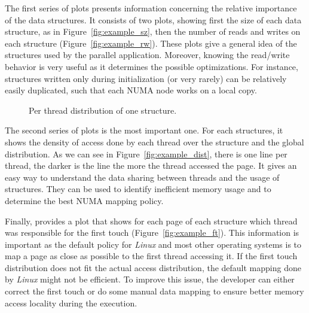 The first series of plots presents information concerning the relative
importance of the data structures. It consists of two plots, showing first the
size of each data structure, as in Figure~\ref{fig:example_sz}, then the
number of reads and writes  on each structure (Figure~\ref{fig:example_rw}). These plots give a
general idea of the structures used by the parallel application.
Moreover, knowing the read/write behavior is very
useful as it determines the possible optimizations. For instance, structures
written only during initialization (or very rarely) can be relatively easily
duplicated, such that each NUMA node works on a local copy.

\begin{figure}[htb]
    \centering

    \caption{Per thread distribution of one structure.}
    \label{fig:example_plot2}
\end{figure}

The second series of plots is the most important one. For each structures, it
shows the density of access done by each thread over the structure and the
global distribution. As we can see in Figure~\ref{fig:example_dist}, there is
one line per thread, the darker is the line the more the thread accessed the
page. It gives an easy way to understand the data sharing between threads and
the usage of structures. They can be used to identify inefficient memory usage
and to determine the best NUMA mapping policy.



Finally, \TABARNAC provides a plot that shows for each page of each structure
which thread was responsible for the first touch
(Figure~\ref{fig:example_ft}). This information is important as the
default policy for \emph{Linux} and most other operating systems is to map a page as close as possible to the first
thread accessing it. If the first touch distribution does not fit the actual
access distribution, the default mapping done by \emph{Linux} might not be
efficient. To improve this issue, the developer can either correct the first
touch or do some manual data mapping to ensure better memory access locality
during the execution.
